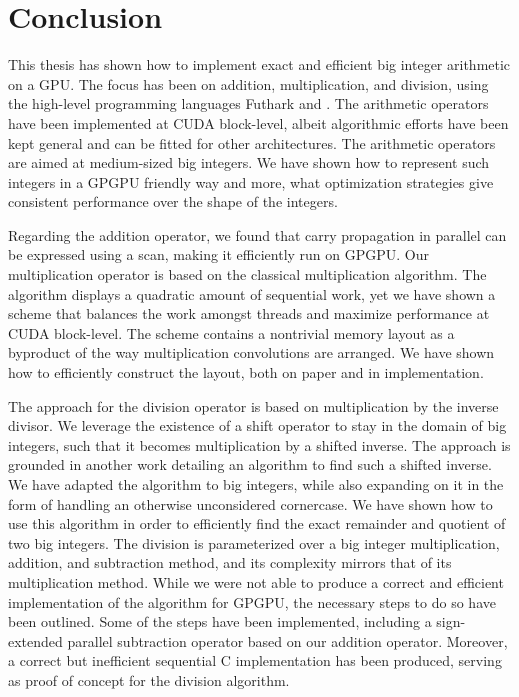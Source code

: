 \section{Conclusion}
\label{sec:conc}
This thesis has shown how to implement exact and efficient big integer
arithmetic on a GPU. The focus has been on addition, multiplication, and
division, using the high-level programming languages Futhark and \cpp. The
arithmetic operators have been implemented at CUDA block-level, albeit
algorithmic efforts have been kept general and can be fitted for other
architectures. The arithmetic operators are aimed at medium-sized big integers.
We have shown how to represent such integers in a GPGPU friendly way and more,
what optimization strategies give consistent performance over the shape of the
integers.

\pagebreak

Regarding the addition operator, we found that carry propagation in parallel can
be expressed using a scan, making it efficiently run on GPGPU. Our
multiplication operator is based on the classical multiplication algorithm. The
algorithm displays a quadratic amount of sequential work, yet we have shown a
scheme that balances the work amongst threads and maximize performance at CUDA
block-level. The scheme contains a nontrivial memory layout as a byproduct of the
way multiplication convolutions are arranged. We have shown how to efficiently
construct the layout, both on paper and in implementation.

The approach for the division operator is based on multiplication by the inverse
divisor. We leverage the existence of a shift operator to stay in the domain of
big integers, such that it becomes multiplication by a shifted inverse. The
approach is grounded in another work detailing an algorithm to find such a
shifted inverse. We have adapted the algorithm to big integers, while also
expanding on it in the form of handling an otherwise unconsidered cornercase. We
have shown how to use this algorithm in order to efficiently find the exact
remainder and quotient of two big integers. The division is parameterized over a
big integer multiplication, addition, and subtraction method, and its complexity
mirrors that of its multiplication method. While we were not able to produce a
correct and efficient implementation of the algorithm for GPGPU, the necessary
steps to do so have been outlined. Some of the steps have been implemented,
including a sign-extended parallel subtraction operator based on our addition
operator. Moreover, a correct but inefficient sequential C implementation has
been produced, serving as proof of concept for the division algorithm.

